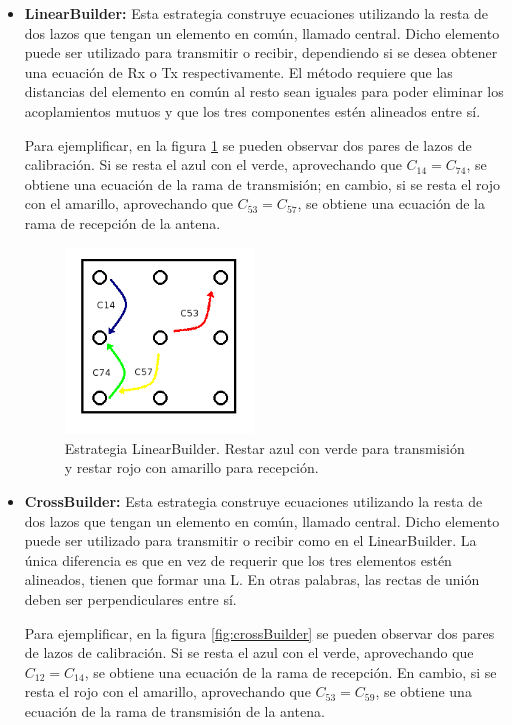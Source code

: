 \begin{itemize}
	\item \textbf{LinearBuilder:} Esta estrategia construye ecuaciones utilizando la resta de dos lazos que tengan un elemento en 
		común, llamado central. Dicho elemento puede ser utilizado para transmitir o recibir, dependiendo si se desea obtener una 
        ecuación de Rx o Tx respectivamente. El método requiere que las distancias del elemento en común al resto sean iguales
		para poder eliminar los acoplamientos mutuos y que los tres componentes estén alineados entre sí.
         
		Para ejemplificar, en la figura \ref{fig:linealBuilder} se pueden observar dos pares de lazos de calibración. Si se resta el
        azul con el verde, aprovechando que $C_{14} = C_{74}$, se obtiene una ecuación de la rama de transmisión; en cambio, 
        si se resta el rojo con el amarillo, aprovechando que $C_{53} = C_{57}$, se obtiene una ecuación de la rama de 
        recepción de la antena.
			
		\begin{figure}[H]
		 \centering
		 \includegraphics[width=5cm]{gfx/linearBuilder.png}
		 \caption{Estrategia LinearBuilder. Restar azul con verde para transmisión y restar rojo con amarillo para recepción.}
		 \label{fig:linealBuilder}
		\end{figure}

	\item \textbf{CrossBuilder:} Esta estrategia construye ecuaciones utilizando la resta de dos lazos que tengan un elemento en 
		común, llamado central. Dicho elemento puede ser utilizado para transmitir o recibir como en el LinearBuilder. La única 
        diferencia es que en vez de requerir que los tres elementos estén alineados, tienen que formar una L. En otras palabras,
        las rectas de unión deben ser perpendiculares entre sí.
		
        Para ejemplificar, en la figura \ref{fig:crossBuilder} se pueden observar dos pares de lazos de calibración. Si se resta el
        azul con el verde, aprovechando que $C_{12} = C_{14}$, se obtiene una ecuación de la rama de recepción. En cambio, 
        si se resta el rojo con el amarillo, aprovechando que $C_{53} = C_{59}$, se obtiene una ecuación de la rama de 
        transmisión de la antena.


\end{itemize}
